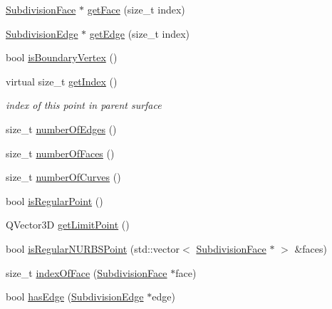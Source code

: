 \begin{DoxyCompactItemize}
\hyperlink{classShipCADGeometry_1_1SubdivisionFace}{Subdivision\-Face} $\ast$ \hyperlink{classShipCADGeometry_1_1SubdivisionPoint_a673d2a2c94f52e5523a012959417dcc3}{get\-Face} (size\-\_\-t index)
\item 
\hyperlink{classShipCADGeometry_1_1SubdivisionEdge}{Subdivision\-Edge} $\ast$ \hyperlink{classShipCADGeometry_1_1SubdivisionPoint_a518c4e3dc5de74950c87ff0f733716ba}{get\-Edge} (size\-\_\-t index)
\item 
bool \hyperlink{classShipCADGeometry_1_1SubdivisionPoint_afbcf1244015a92be04faed20163699f7}{is\-Boundary\-Vertex} ()
\item 
virtual size\-\_\-t \hyperlink{classShipCADGeometry_1_1SubdivisionPoint_a8406682549c10ec9e1a184132f6ed2f0}{get\-Index} ()
\begin{DoxyCompactList}\small\item\em index of this point in parent surface \end{DoxyCompactList}\item 
size\-\_\-t \hyperlink{classShipCADGeometry_1_1SubdivisionPoint_a7f798acd30dd4f5c9d0a9832ddd088de}{number\-Of\-Edges} ()
\item 
size\-\_\-t \hyperlink{classShipCADGeometry_1_1SubdivisionPoint_a24915c41e00cd2781aa40b09c7425486}{number\-Of\-Faces} ()
\item 
size\-\_\-t \hyperlink{classShipCADGeometry_1_1SubdivisionPoint_afc9659ec83083e7725ce14a12a74d2f0}{number\-Of\-Curves} ()
\item 
bool \hyperlink{classShipCADGeometry_1_1SubdivisionPoint_a6a0b4b628563cda2b2979ce6222e8a20}{is\-Regular\-Point} ()
\item 
Q\-Vector3\-D \hyperlink{classShipCADGeometry_1_1SubdivisionPoint_a0eb743069fe2ee2e99cdf7417b2400d5}{get\-Limit\-Point} ()
\item 
bool \hyperlink{classShipCADGeometry_1_1SubdivisionPoint_a88243019864c79766266cee627671183}{is\-Regular\-N\-U\-R\-B\-S\-Point} (std\-::vector$<$ \hyperlink{classShipCADGeometry_1_1SubdivisionFace}{Subdivision\-Face} $\ast$ $>$ \&faces)
\item 
size\-\_\-t \hyperlink{classShipCADGeometry_1_1SubdivisionPoint_a354475f80700fee46dcb46f8602c5345}{index\-Of\-Face} (\hyperlink{classShipCADGeometry_1_1SubdivisionFace}{Subdivision\-Face} $\ast$face)
\item 
bool \hyperlink{classShipCADGeometry_1_1SubdivisionPoint_ada0d082be616958c024bb1743d392e2f}{has\-Edge} (\hyperlink{classShipCADGeometry_1_1SubdivisionEdge}{Subdivision\-Edge} $\ast$edge)
\item 

\end{DoxyCompactItemize}
